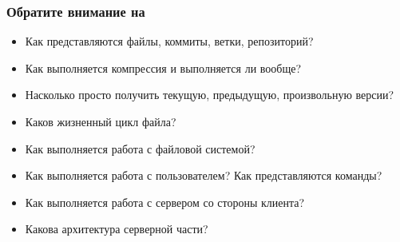 \documentclass{../cscslides}
\begin{document}
    \begin{frame}
        \frametitle{Обратите внимание на}
        \begin{itemize}
            \item Как представляются файлы, коммиты, ветки, репозиторий?
            \item Как выполняется компрессия и выполняется ли вообще? 
            \item Насколько просто получить текущую, предыдущую, произвольную версии?
            \item Каков жизненный цикл файла?
            \item Как выполняется работа с файловой системой?
            \item Как выполняется работа с пользователем? Как представляются команды?
            \item Как выполняется работа с сервером со стороны клиента?
            \item Какова архитектура серверной части?
        \end{itemize}
    \end{frame}
\end{document}
